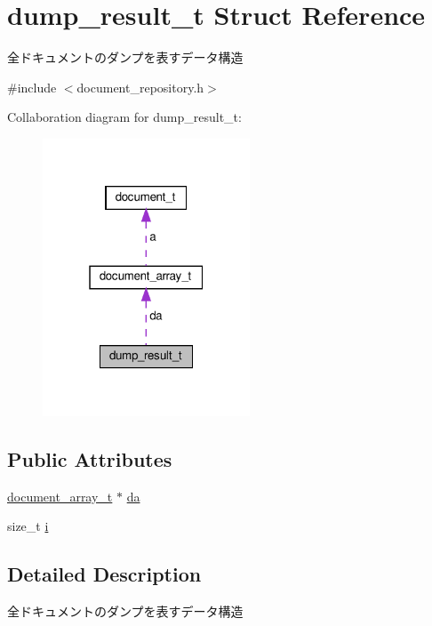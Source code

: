 \hypertarget{structdump__result__t}{}\section{dump\+\_\+result\+\_\+t Struct Reference}
\label{structdump__result__t}


全ドキュメントのダンプを表すデータ構造  




{\ttfamily \#include $<$document\+\_\+repository.\+h$>$}



Collaboration diagram for dump\+\_\+result\+\_\+t\+:\nopagebreak
\begin{figure}[H]
\begin{center}
\leavevmode
\includegraphics[width=175pt]{structdump__result__t__coll__graph}
\end{center}
\end{figure}
\subsection*{Public Attributes}
\begin{DoxyCompactItemize}
\item 
\hyperlink{structdocument__array__t}{document\+\_\+array\+\_\+t} $\ast$ \hyperlink{structdump__result__t_a8bec8965013def292a9ead629d8939a5}{da}
\item 
size\+\_\+t \hyperlink{structdump__result__t_ab5747e1016ae99e9dd3aaf13099572c7}{i}
\end{DoxyCompactItemize}


\subsection{Detailed Description}
全ドキュメントのダンプを表すデータ構造 

